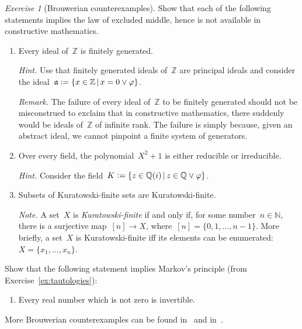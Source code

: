 \documentclass[10pt,reqno,a4paper,openany]{amsbook}
\theoremstyle{definition}
\theoremstyle{plain}
\theoremstyle{remark}
\newcommand{\ZZ}{\mathbb{Z}}
\newcommand{\NN}{\mathbb{N}}
\newcommand{\QQ}{\mathbb{Q}}
\newcommand{\aaa}{\mathfrak{a}}
\newcommand{\?}{\,{:}\,}
\renewcommand{\_}{\mathpunct{.}\,}
\newcommand{\defeq}{\vcentcolon=}
\newtheorem{exercise}[defn]{Exercise}
\begin{document}
\begin{exercise}[Brouwerian counterexamples]
Show that each of the following statements implies the law of excluded middle,
hence is not available in constructive mathematics.
\begin{enumerate}
\item Every ideal of~$\ZZ$ is finitely generated.

{\noindent\scriptsize\emph{Hint.} Use that finitely generated ideals of~$\ZZ$
are principal ideals and consider the ideal~$\aaa \defeq \{ x \in \ZZ
\,|\, x = 0 \vee \varphi \}$.\par}

{\noindent\scriptsize\emph{Remark.} The failure of every ideal of~$\ZZ$ to be
finitely generated should not be misconstrued to exclaim that in constructive
mathematics, there suddenly would be ideals of~$\ZZ$ of infinite rank. The
failure is simply because, given an abstract ideal, we cannot pinpoint a finite
system of generators.\par}

\item Over every field, the polynomial~$X^2 + 1$ is either reducible or
irreducible.

{\noindent\scriptsize\emph{Hint.} Consider the field~$K \defeq \{ z \in \QQ(i)
\,|\, z \in \QQ \vee \varphi \}$.\par}

\item Subsets of Kuratowski-finite sets are Kuratowski-finite.

{\noindent\scriptsize\emph{Note.} A set~$X$ is \emph{Kuratowski-finite} if and
only if, for some number~$n \in \NN$, there is a surjective map~$[n] \to X$,
where~$[n] = \{ 0,1,\ldots,n-1 \}$. More briefly, a set~$X$ is
Kuratowski-finite iff its elements can be enumerated: $X = \{x_1,\ldots,x_n \}$.\par}
\end{enumerate}
Show that the following statement implies Markov's principle (from
Exercise~\ref{ex:tautologies}):
\begin{enumerate}
\addtocounter{enumi}{3}
\item Every real number which is not zero is invertible.
\end{enumerate}
\noindent
More Brouwerian counterexamples can be
found in~\cite{mandelkern:brouwerian-counterexamples} and
in~\cite{mines-richman-ruitenburg:constructive-algebra}.
\end{exercise}
\end{document}
